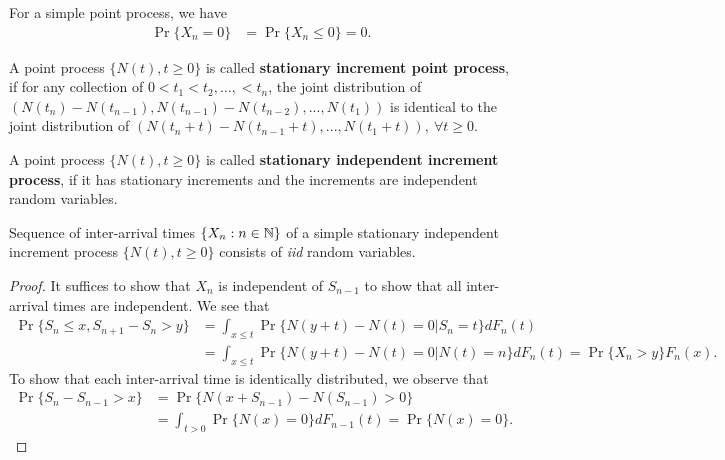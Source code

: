 \documentclass[a4paper,10pt,english]{article}
\begin{document}
\begin{rem} For a simple point process, we have
\begin{align*}
\Pr\{X_{n} = 0\} &= \Pr\{X_n\leqslant 0\} = 0.
\end{align*}
\end{rem}
\begin{defn} A point process $\{N(t), t\geqslant 0\}$ is called \textbf{stationary increment point process}, if for any collection of $0 < t_{1}<t_{2}, \ldots,<t_{n}$, the joint distribution of $(N(t_{n})-N(t_{n-1}),N(t_{n-1})-N(t_{n-2}),...,N(t_{1}))$ is identical to the joint distribution of $(N(t_{n}+t)-N(t_{n-1}+t),...,N(t_{1}+t)), ~ \forall t \geqslant 0$.
\end{defn}

\begin{defn} A point process $\{N(t), t\geqslant 0\}$ is called \textbf{stationary independent increment process}, if it has stationary increments and the increments are independent random variables.
\end{defn}

\begin{lem} Sequence of inter-arrival times $\{X_n: n \in \mathbb{N}\}$ of a simple stationary independent increment process $\{N(t), t \geqslant 0 \}$ consists of \emph{iid} random variables.
\end{lem}
\begin{proof} It suffices to show that $X_n$ is independent of $S_{n-1}$ to show that all inter-arrival times are independent. 
We see that
\begin{align*}
\Pr\{S_n \leqslant x, S_{n+1} - S_n > y\} &= \int_{x \leq t}\Pr\{N(y+t) - N(t) = 0|S_n = t\}dF_n(t)\\
&=\int_{x \leq t}\Pr\{N(y+t) - N(t) = 0|N(t) = n \}dF_n(t) = \Pr\{X_n > y\}F_n(x).
\end{align*}
To show that each inter-arrival time is identically distributed, we observe that
\begin{align*}
\Pr\{S_n - S_{n-1} > x\} &= \Pr\{N(x + S_{n-1}) - N(S_{n-1}) > 0\}\\
&= \int_{t > 0}\Pr\{N(x) = 0\}dF_{n-1}(t) = \Pr\{N(x) = 0\}.
\end{align*}
\end{proof}
\end{document}
